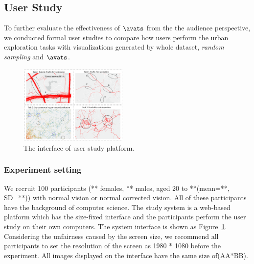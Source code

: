 \subsection{User Study}
To further evaluate the effectiveness of $\avats$ from the the audience perspective, we conducted formal user studies to compare how users perform the urban exploration tasks with visualizations generated by whole dataset, \textit{random sampling} and $\avats$.


\begin{figure}[t]
	\centering
	\includegraphics[width=0.48\textwidth]{pictures/user_study/interface.pdf}
	\vspace{-3mm}
	\caption{The interface of user study platform.}
	\vspace{-5mm}
	\label{fig:user_study}
\end{figure}

\subsubsection{Experiment setting}

We recruit 100 participants (** females, ** males, aged 20 to **(mean=**, SD=**)) with normal vision or normal corrected vision. All of these participants have the background of computer science. 
The study system is a web-based platform which has the size-fixed interface and the participants perform the user study on their own  computers. The system interface is shown as Figure~\ref{fig:user_study}. Considering the unfairness caused by the screen size, we recommend all participants to set the resolution of the screen as 1980 * 1080 before the experiment. All images displayed on the interface have the same size of(AA*BB).  

